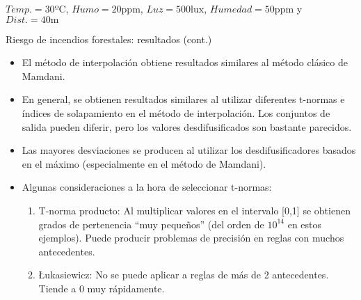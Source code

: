 \documentclass{beamer}
\begin{document}
\begin{frame}
\centering
\footnotesize
$Temp. = 30\text{ºC}$, $Humo = 20 \text{ppm}$, $Luz = 500 \text{lux}$, $Humedad = 50 \text{ppm}$ y $Dist. = 40 \text{m}$
\begin{center}
	\tiny
	
\end{center}
\end{frame}

\begin{frame}{Riesgo de incendios forestales: resultados (cont.)}
\begin{itemize}
	\item El método de interpolación obtiene resultados similares al método clásico de Mamdani.
	\item En general, se obtienen resultados similares al utilizar diferentes t-normas e índices de solapamiento en el método de interpolación. Los conjuntos de salida pueden diferir, pero los valores desdifusificados son bastante parecidos.
	\item Las mayores desviaciones se producen al utilizar los desdifusificadores basados en el máximo (especialmente en el método de Mamdani).
	\item Algunas consideraciones a la hora de seleccionar t-normas:
		\begin{enumerate}
			\item T-norma producto: Al multiplicar valores en el intervalo [0,1] se obtienen grados de pertenencia ``muy pequeños'' (del orden de $10^{14}$ en estos ejemplos). Puede producir problemas de precisión en reglas con muchos antecedentes.
			\item \L{}ukasiewicz: No se puede aplicar a reglas de más de 2 antecedentes. Tiende a 0 muy rápidamente.
		\end{enumerate}
\end{itemize}
\end{frame}
\end{document}
